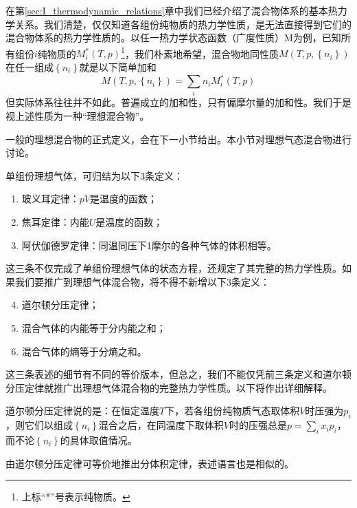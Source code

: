 \documentclass[main.tex]{subfiles}
\begin{document}
在第\ref{sec:I_thermodynamic_relations}章中我们已经介绍了混合物体系的基本热力学关系。我们清楚，仅仅知道各组份纯物质的热力学性质，是无法直接得到它们的混合物体系的热力学性质的。以任一热力学状态函数（广度性质）M为例，已知所有组份$i$纯物质的$M_i^*\left(T,p\right)$\footnote{上标“*”号表示纯物质。}，我们朴素地希望，混合物地同性质$M\left(T,p,\left\{n_i\right\}\right)$在任一组成$\left\{n_i\right\}$就是以下简单加和
\[M\left(T,p,\left\{n_i\right\}\right)=\sum_i n_i M_i^*\left(T,p\right)\]
但实际体系往往并不如此。普遍成立的加和性，只有偏摩尔量的加和性。我们于是视上述性质为一种“理想混合物”。

一般的理想混合物的正式定义，会在下一小节给出。本小节对理想气态混合物进行讨论。

单组份理想气体，可归结为以下3条定义：
\begin{enumerate}
    \item 玻义耳定律：$pV$是温度的函数；
    \item 焦耳定律：内能$U$是温度的函数；
    \item 阿伏伽德罗定律：同温同压下1摩尔的各种气体的体积相等。
\end{enumerate}
这三条不仅完成了单组份理想气体的状态方程，还规定了其完整的热力学性质。如果我们要推广到理想气体混合物，将不得不新增以下3条定义：
\begin{enumerate}\setcounter{enumi}{3}
    \item 道尔顿分压定律；
    \item 混合气体的内能等于分内能之和；
    \item 混合气体的熵等于分熵之和。
\end{enumerate}

这三条表述的细节有不同的等价版本，但总之，我们不能仅凭前三条定义和道尔顿分压定律就推广出理想气体混合物的完整热力学性质。以下将作出详细解释。

道尔顿分压定律说的是：在恒定温度$T$下，若各组份纯物质气态取体积$V$时压强为$p_i$，则它们以组成$\left\{n_i\right\}$混合之后，在同温度下取体积$V$时的压强总是$p=\sum_i x_ip_i$，而不论$\left\{n_i\right\}$的具体取值情况。

由道尔顿分压定律可等价地推出分体积定律，表述语言也是相似的。
\end{document}
